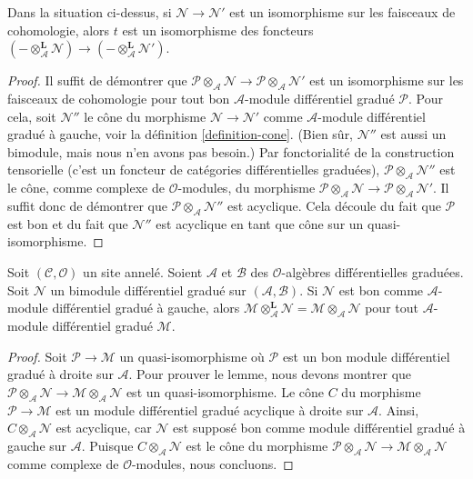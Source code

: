 \begin{lemma}
\label{lemma-tensor-symmetry}
Dans la situation ci-dessus, si $\mathcal{N} \to \mathcal{N}'$ est un isomorphisme sur les faisceaux de cohomologie, alors $t$ est un isomorphisme des foncteurs $(- \otimes_\mathcal{A}^\mathbf{L} \mathcal{N}) \to (- \otimes_\mathcal{A}^\mathbf{L} \mathcal{N}')$.
\end{lemma}

\begin{proof}
Il suffit de démontrer que $\mathcal{P} \otimes_\mathcal{A} \mathcal{N} \to \mathcal{P} \otimes_\mathcal{A} \mathcal{N}'$ est un isomorphisme sur les faisceaux de cohomologie pour tout bon $\mathcal{A}$-module différentiel gradué $\mathcal{P}$.
Pour cela, soit $\mathcal{N}''$ le cône du morphisme $\mathcal{N} \to \mathcal{N}'$ comme $\mathcal{A}$-module différentiel gradué à gauche, voir la définition \ref{definition-cone}. (Bien sûr, $\mathcal{N}''$ est aussi un bimodule, mais nous n'en avons pas besoin.) Par fonctorialité de la construction tensorielle (c'est un foncteur de catégories différentielles graduées), $\mathcal{P} \otimes_\mathcal{A} \mathcal{N}''$ est le cône, comme complexe de $\mathcal{O}$-modules, du morphisme $\mathcal{P} \otimes_\mathcal{A} \mathcal{N} \to \mathcal{P} \otimes_\mathcal{A} \mathcal{N}'$.
Il suffit donc de démontrer que $\mathcal{P} \otimes_\mathcal{A} \mathcal{N}''$ est acyclique.
Cela découle du fait que $\mathcal{P}$ est bon et du fait que $\mathcal{N}''$ est acyclique en tant que cône sur un quasi-isomorphisme.
\end{proof}

\begin{lemma}
\label{lemma-good-on-other-side}
Soit $(\mathcal{C}, \mathcal{O})$ un site annelé.
Soient $\mathcal{A}$ et $\mathcal{B}$ des $\mathcal{O}$-algèbres différentielles graduées.
Soit $\mathcal{N}$ un bimodule différentiel gradué sur $(\mathcal{A}, \mathcal{B})$.
Si $\mathcal{N}$ est bon comme $\mathcal{A}$-module différentiel gradué à gauche, alors $\mathcal{M} \otimes_\mathcal{A}^\mathbf{L} \mathcal{N} = \mathcal{M} \otimes_\mathcal{A} \mathcal{N}$ pour tout $\mathcal{A}$-module différentiel gradué $\mathcal{M}$.
\end{lemma}

\begin{proof}
Soit $\mathcal{P} \to \mathcal{M}$ un quasi-isomorphisme où $\mathcal{P}$ est un bon module différentiel gradué à droite sur $\mathcal{A}$.
Pour prouver le lemme, nous devons montrer que $\mathcal{P} \otimes_\mathcal{A} \mathcal{N} \to \mathcal{M} \otimes_\mathcal{A} \mathcal{N}$ est un quasi-isomorphisme.
Le cône $C$ du morphisme $\mathcal{P} \to \mathcal{M}$ est un module différentiel gradué acyclique à droite sur $\mathcal{A}$.
Ainsi, $C \otimes_\mathcal{A} \mathcal{N}$ est acyclique, car $\mathcal{N}$ est supposé bon comme module différentiel gradué à gauche sur $\mathcal{A}$.
Puisque $C \otimes_\mathcal{A} \mathcal{N}$ est le cône du morphisme $\mathcal{P} \otimes_\mathcal{A} \mathcal{N} \to \mathcal{M} \otimes_\mathcal{A} \mathcal{N}$ comme complexe de $\mathcal{O}$-modules, nous concluons.
\end{proof}

